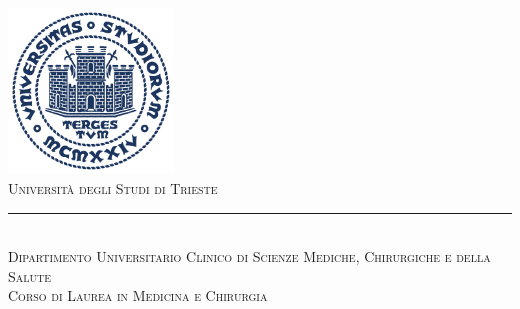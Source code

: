 
\begin{titlepage} %
\null\vfill
\begin{center}
\large
\sffamily
	\newcommand{\HRule}{\rule{\linewidth}{0.5mm}} %
	
	\center %
	
	
	\includegraphics[width=0.33\textwidth]{Figure/logoUniTs_tondo.pdf}\\[0.5cm] %
	 
	
	
	\textsc{\LARGE Universit\`a degli Studi di Trieste}\\
	\HRule\\[0.5cm] %
	
	\textsc{\Large Dipartimento Universitario Clinico di Scienze Mediche, Chirurgiche e della Salute}\\[0.5cm] %
	
	\textsc{\large Corso di Laurea in Medicina e Chirurgia}\\ [0.5cm] %
	

\end{center}
\end{titlepage}
